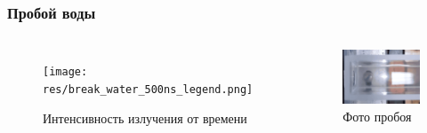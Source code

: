 \documentclass{beamer}
\begin{document}
	\begin{frame}
		\frametitle{Пробой воды}
		\begin{columns}
			\begin{figure}
				\centering
				\texttt{[image: res/break\_water\_500ns\_legend.png]}
				\caption*{Интенсивность излучения от времени}
			\end{figure}	
			\begin{figure}
				\centering
				\includegraphics[width=\linewidth]{res/water_spark.png}
				\caption*{Фото пробоя}
			\end{figure}
		\end{columns}
	\end{frame}	
\end{document}
